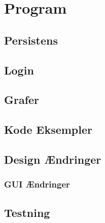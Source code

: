 \chapter{Program}

\section{Persistens}

\section{Login}

\section{Grafer}

\section{Kode Eksempler}

\section{Design Ændringer}
\subsection{GUI Ændringer}

\section{Testning}
